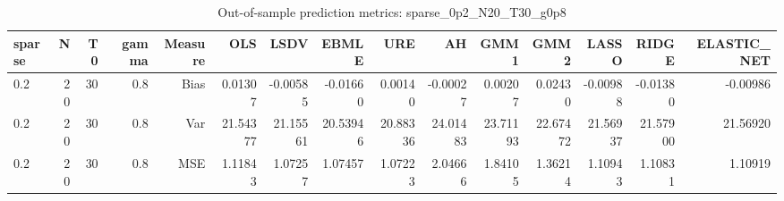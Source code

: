 \begin{table}[!htbp]\centering
\caption{Out-of-sample prediction metrics: sparse_0p2_N20_T30_g0p8}
\label{tab:table3_sparse_0p2_N20_T30_g0p8}
\begin{tabular}{lrrrrrrrrrrrrrr}
\hline
sparse & N & T0 & gamma & Measure & OLS & LSDV & EBMLE & URE & AH & GMM1 & GMM2 & LASSO & RIDGE & ELASTIC_NET \\
\hline
0.2 & 20 & 30 & 0.8 & Bias & 0.01307 & -0.00585 & -0.01660 & 0.00140 & -0.00027 & 0.00207 & 0.02430 & -0.00988 & -0.01380 & -0.00986 \\
0.2 & 20 & 30 & 0.8 & Var & 21.54377 & 21.15561 & 20.53946 & 20.88336 & 24.01483 & 23.71193 & 22.67472 & 21.56937 & 21.57900 & 21.56920 \\
0.2 & 20 & 30 & 0.8 & MSE & 1.11843 & 1.07257 & 1.07457 & 1.07223 & 2.04666 & 1.84105 & 1.36214 & 1.10943 & 1.10831 & 1.10919 \\
\hline
\end{tabular}
\end{table}

